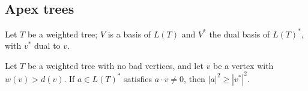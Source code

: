 \subsection*{Apex trees}


Let $T$ be a weighted tree; $V$ is a basis of $L(T)$ and $V^{*}$ the dual basis
of $L(T)^{*}$, with $v^{*}$ dual to $v$.

\begin{lem}\label{lem:apex}
Let $T$ be a weighted tree with no bad vertices, and let $v$ be a vertex with
$w(v)>d(v)$. If $a\in L(T)^{*}$ satisfies $a\cdot v\neq0$, then
$|a|^2\geq|v^{*}|^2$.
\end{lem}

